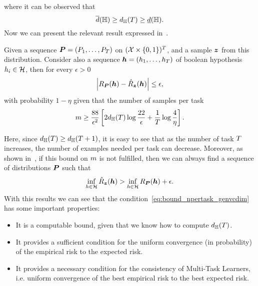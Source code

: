 where it can be observed that 
\begin{equation}
    \label{eq:genvc_inequalities}
    \overline{d}(\hypspacef) \geq  d_\hypspacef(\ntasks)\geq \underline{d}(\hypspacef).
\end{equation}
Now we can present the relevant result expressed in~\cite[Corollary~13]{baxter2000model}.
\begin{theorem}\label{th:baxter_vcdim}
    Given a sequence $\bm{P} = (P_1, \ldots, P_T)$ on $(\mathcal{X} \times \left\{0, 1\right\})^T$, and a sample $\bm{z}$ from this distribution. Consider also a sequence $\bm{h} = (h_1, \ldots, h_T)$ of boolean hypothesis $h_i \in \mathcal{H}$, then for every $\epsilon > 0$
\begin{equation}
    \nonumber
    \left|R_{\bm{P}}(\bm{h}) - \hat{R}_{\bm{z}}(\bm{h})\right| \leq \epsilon,
\end{equation}
with probability $1 - \eta$ given that the number of samples per task
\begin{equation}
    \label{eq:bound_npertask_genvcdim}
    \npertask \geq \frac{88}{\epsilon^2} \left[2 d_\hypspacef(\ntasks) \log \frac{22}{\epsilon} + \frac{1}{\ntasks}\log\frac{4}{\eta} \right] .
\end{equation}
\end{theorem}
Here, since $d_{\mathbb{H}}(T) \geq d_{\mathbb{H}}(T+1)$, it is easy to see that as the number of task $T$ increases, the number of examples needed per task can decrease. 
Moreover, as shown in~\cite[Theorem~14]{baxter2000model}, if this bound on $m$ is not fulfilled, then we can always find a sequence of distributions $\bm{P}$ such that
\begin{equation}
    \nonumber
    \inf_{h \in \mathcal{H}} \hat{R}_{\bm{z}}(\bm{h}) > \inf_{h \in \mathcal{H}} R_{\bm{P}}(\bm{h}) + \epsilon .
\end{equation}
With this results we can see that the condition~\eqref{eq:bound_npertask_genvcdim} has some important properties:
\begin{itemize}
    \item It is a computable bound, given that we know how to compute $d_{\mathbb{H}}(T)$.
    \item It provides a sufficient condition for the uniform convergence (in probability) of the empirical risk to the expected risk.
    \item It provides a necessary condition for the consistency of Multi-Task Learners, i.e. uniform convergence of the best empirical risk to the best expected risk.
\end{itemize}

